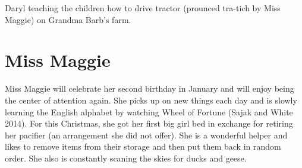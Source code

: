 \documentclass{article}
\makeatletter
\newenvironment{figurehere}
  {\def\@captype{figure}}
  {}
\makeatother
\begin{document}
\begin{multicols}{2}
\begin{figurehere}
 \centering   
 \caption{Daryl teaching the children how to drive tractor (prounced tra-tich by Miss Maggie)
on Grandma Barb's farm.}
\end{figurehere}

\section{Miss Maggie}

Miss Maggie will celebrate her second birthday in January and will enjoy 
being the center of attention again.  She picks up on new things each day 
and is slowly learning the English alphabet by watching Wheel of Fortune
 (Sajak and White 2014).  For this Christmas, she got 
her first big girl bed in exchange for retiring her pacifier (an 
arrangement she did not offer).  She is a wonderful helper and likes to remove items
from their storage and then put them back in random order.  She also is
constantly scaning the skies for ducks and geese.


\end{multicols}
\end{document}
